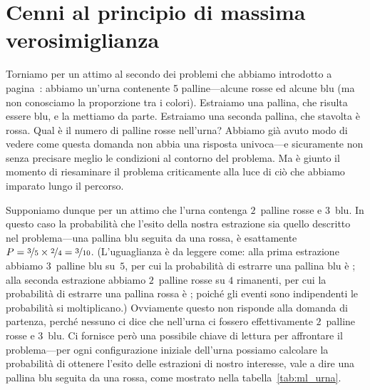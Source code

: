 \chapter{Cenni al principio di massima verosimiglianza}

Torniamo per un attimo al secondo dei problemi che abbiamo introdotto a
pagina~\pageref{item:due problemi}: abbiamo un'urna contenente 5
palline---alcune rosse ed alcune blu (ma non conosciamo la proporzione tra i
colori). Estraiamo una pallina, che risulta essere blu, e la mettiamo da parte.
Estraiamo una seconda pallina, che stavolta è rossa. Qual è il numero di
palline rosse nell'urna?
Abbiamo già avuto modo di vedere come questa domanda non abbia una risposta
univoca---e sicuramente non senza precisare meglio le condizioni al contorno
del problema. Ma è giunto il momento di riesaminare il problema criticamente
alla luce di ciò che abbiamo imparato lungo il percorso.

Supponiamo dunque per un attimo che l'urna contenga $2$~palline rosse e $3$~blu.
In questo caso la probabilità che l'esito della nostra estrazione sia quello
descritto nel problema---una pallina blu seguita da una rossa, è
esattamente $P = \nicefrac{3}{5} \times \nicefrac{2}{4} = \nicefrac{3}{10}$.
(L'uguaglianza è da leggere come: alla prima estrazione abbiamo $3$~palline
blu su~$5$, per cui la probabilità di estrarre una pallina blu è
; alla seconda estrazione abbiamo $2$~palline rosse su $4$
rimanenti, per cui la probabilità di estrarre una pallina rossa è
; poiché gli eventi sono indipendenti le probabilità si
moltiplicano.) Ovviamente questo non risponde alla domanda di partenza,
perché nessuno ci dice che nell'urna ci fossero effettivamente $2$~palline
rosse e $3$~blu. Ci fornisce però una possibile chiave di lettura
per affrontare il problema---per ogni configurazione iniziale dell'urna
possiamo calcolare la probabilità di ottenere l'esito delle estrazioni di
nostro interesse, vale a dire una pallina blu seguita da una rossa, come
mostrato nella tabella~\ref{tab:ml_urna}.

